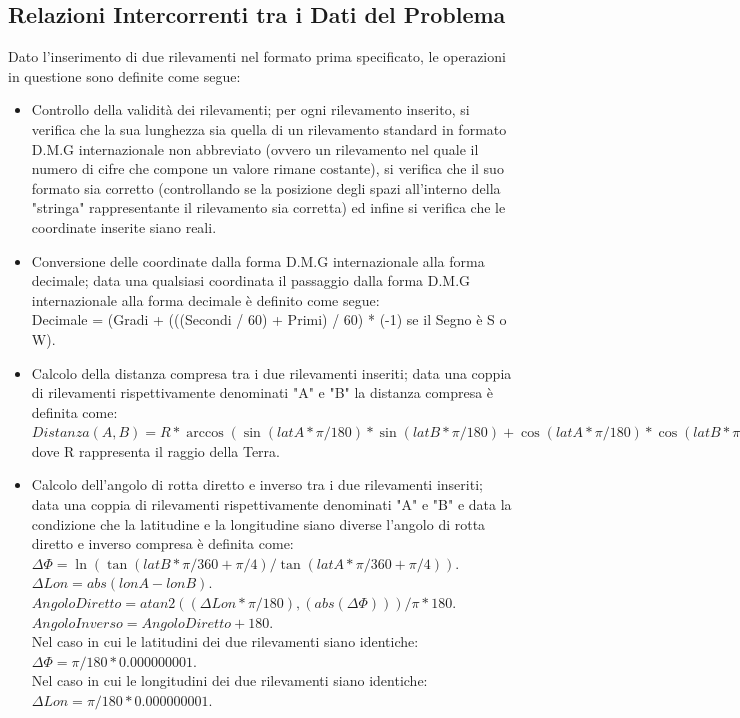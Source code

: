 \documentclass{article}
\begin{document}
\subsection{Relazioni Intercorrenti tra i Dati del Problema}
Dato l'inserimento di due rilevamenti nel formato prima specificato, le operazioni in questione sono definite come segue:
\begin{itemize}
	\item Controllo della validità dei rilevamenti; per ogni rilevamento inserito, si verifica che la sua lunghezza sia quella di un rilevamento standard in formato D.M.G internazionale non abbreviato (ovvero un rilevamento nel quale il numero di cifre che compone un valore rimane costante), si verifica che il suo formato sia corretto (controllando se la posizione degli spazi all'interno della "stringa" rappresentante il rilevamento sia corretta) ed infine si verifica che le coordinate inserite siano reali. 
	
	\item Conversione delle coordinate dalla forma D.M.G internazionale alla forma decimale; data una qualsiasi coordinata il passaggio dalla forma D.M.G internazionale alla forma decimale è definito come segue: \\
	Decimale = (Gradi + (((Secondi / 60) + Primi) / 60) * (-1) se il Segno è  S o W).
	
	\item Calcolo della distanza compresa tra i due rilevamenti inseriti;  data una coppia di rilevamenti rispettivamente denominati "A" e "B" la distanza compresa è definita come: \\
	$Distanza(A, B) = R * \arccos(\sin(latA * \pi / 180) * \sin(latB * \pi / 180) + \cos(latA * \pi / 180) * \cos(latB * \pi / 180) * \cos((lonA - lonB) * \pi / 180)). $\\
	dove R rappresenta il raggio della Terra.
	
	\item Calcolo dell'angolo di rotta diretto e inverso tra i due rilevamenti inseriti; data una coppia di rilevamenti rispettivamente denominati "A" e "B" e data la condizione che la latitudine e la longitudine siano diverse l'angolo di rotta diretto e inverso compresa è definita come: \\
	$\Delta\Phi = \ln( \tan(latB * \pi / 360 + \pi / 4 ) / \tan(latA * \pi / 360 + \pi / 4 )). $\\
	$ \Delta Lon = abs(lonA - lonB). $ \\
	$ Angolo Diretto = atan2((\Delta Lon * \pi / 180), (abs(\Delta\Phi))) / \pi * 180.$\\
	$ Angolo Inverso = Angolo Diretto+ 180.$\\
	Nel caso in cui le latitudini dei due rilevamenti siano identiche:\\
	$\Delta\Phi = \pi / 180 * 0.000000001.$\\
	Nel caso in cui le longitudini dei due rilevamenti siano identiche:\\
	$\Delta Lon = \pi / 180 * 0.000000001.$\\
\end{itemize}
\newpage
\end{document}

